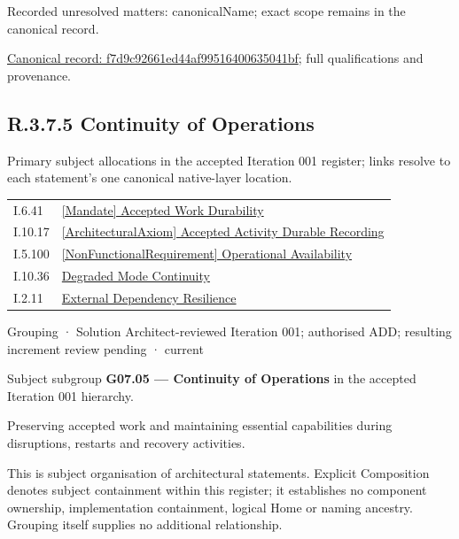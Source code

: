 {\small Recorded unresolved matters: canonicalName; exact scope remains in the canonical record.}\par
{\footnotesize \href{../../../../continuum/grouping/f7d9c92661ed44af99516400635041bf.md}{Canonical record: f7d9c92661ed44af99516400635041bf}; full qualifications and provenance.}\par
\subsection*{R.3.7.5 Continuity of Operations}
\label{navigation:R.3.7.5}

Primary subject allocations in the accepted Iteration 001 register; links resolve to each statement’s one canonical native-layer location.\par
\begin{longtable}{p{.22\linewidth}p{.73\linewidth}}
I.6.41 & \hyperref[element:eabd38371b6940289d9a4bf8e9773942]{[Mandate] Accepted Work Durability} \\
I.10.17 & \hyperref[element:6ee491b8c08d41868c3a7652fb794756]{[ArchitecturalAxiom] Accepted Activity Durable Recording} \\
I.5.100 & \hyperref[element:65ac0367b7f241149ad1839032004039]{[NonFunctionalRequirement] Operational Availability} \\
I.10.36 & \hyperref[element:51191ca802f54efb8554d20423199cd0]{Degraded Mode Continuity} \\
I.2.11 & \hyperref[element:150b3b1eea9b484b89ddc609bf550485]{External Dependency Resilience} \\
\end{longtable}
\label{element:41900f15d1d2431295a4b9dc1aa752c0}
{\small Grouping · Solution Architect-reviewed Iteration 001; authorised ADD; resulting increment review pending · current}\par

Subject subgroup \textbf{G07.05 — Continuity of Operations} in the accepted Iteration 001 hierarchy.



Preserving accepted work and maintaining essential capabilities during disruptions, restarts and recovery activities.



This is subject organisation of architectural statements. Explicit Composition denotes subject containment within this register; it establishes no component ownership, implementation containment, logical Home or naming ancestry. Grouping itself supplies no additional relationship.


